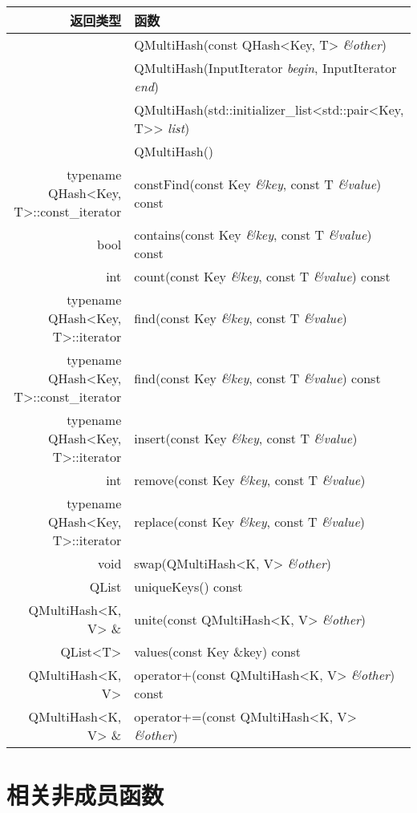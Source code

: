 \begin{longtable}[l]{|r|m{28em}|}   
    \hline
    返回类型 	& 函数 \\
    \hline
    &QMultiHash(const QHash<Key, T> \emph{\&other}) \\
    \hline
	&QMultiHash(InputIterator \emph{begin}, InputIterator \emph{end}) \\
    \hline
	&QMultiHash(std::initializer\_list<std::pair<Key, T>> \emph{list}) \\
    \hline
	&QMultiHash()\\
\hline
typename QHash<Key, T>::const\_iterator &	constFind(const Key \emph{\&key}, const T \emph{\&value}) const \\
\hline
bool 	& contains(const Key \emph{\&key}, const T \emph{\&value}) const \\
\hline
int &	count(const Key \emph{\&key}, const T \emph{\&value}) const \\
\hline
typename QHash<Key, T>::iterator & find(const Key \emph{\&key}, const T \emph{\&value}) \\
\hline
typename QHash<Key, T>::const\_iterator &	find(const Key \emph{\&key}, const T \emph{\&value}) const \\
\hline
typename QHash<Key, T>::iterator &	insert(const Key \emph{\&key}, const T \emph{\&value}) \\
\hline
int &	remove(const Key  \emph{\&key}, const T  \emph{\&value}) \\
\hline
typename QHash<Key, T>::iterator &	replace(const Key \emph{\&key}, const T \emph{\&value}) \\
\hline
void 	& swap(QMultiHash<K, V>  \emph{\&other})\\
\hline
QList 	& uniqueKeys() const\\
\hline
QMultiHash<K, V> \& &	unite(const QMultiHash<K, V> \emph{\&other}) \\
\hline
QList<T> &	values(const Key \&key) const \\
\hline
QMultiHash<K, V> 	&operator+(const QMultiHash<K, V> \emph{\&other}) const\\
\hline
QMultiHash<K, V> \& &	operator+=(const QMultiHash<K, V> \emph{\&other})\\
    \hline
\end{longtable}

\section{相关非成员函数}

